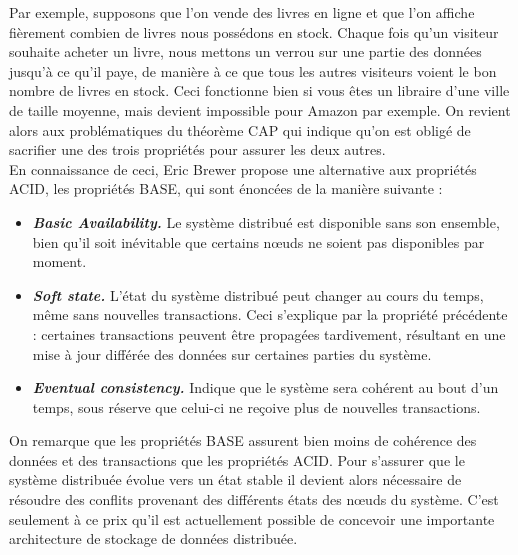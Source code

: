 	Par exemple, supposons que l'on vende des livres en ligne et que l'on affiche fièrement combien de livres nous possédons en stock. Chaque fois qu'un visiteur souhaite acheter un livre, nous mettons un verrou sur une partie des données jusqu'à ce qu'il paye, de manière à ce que tous les autres visiteurs voient le bon nombre de livres en stock. Ceci fonctionne bien si vous êtes un libraire d'une ville de taille moyenne, mais devient impossible pour Amazon par exemple. On revient alors aux problématiques du théorème CAP qui indique qu'on est obligé de sacrifier une des trois propriétés pour assurer les deux autres.\\

	En connaissance de ceci, Eric Brewer propose une alternative aux propriétés ACID, les propriétés BASE, qui sont énoncées de la manière suivante :
	\vspace{10px}
	\begin{itemize}
	 	\item \textbf{\textit{Basic Availability.}} Le système distribué est disponible sans son ensemble, bien qu'il soit inévitable que certains nœuds ne soient pas disponibles par moment.
	 	\item \textbf{\textit{Soft state.}} L'état du système distribué peut changer au cours du temps, même sans nouvelles transactions. Ceci s'explique par la propriété précédente : certaines transactions peuvent être propagées tardivement, résultant en une mise à jour différée des données sur certaines parties du système.
	 	\item \textbf{\textit{Eventual consistency.}} Indique que le système sera cohérent au bout d'un temps, sous réserve que celui-ci ne reçoive plus de nouvelles transactions.
	 \end{itemize}
	 \vspace{20px}
	 On remarque que les propriétés BASE assurent bien moins de cohérence des données et des transactions que les propriétés ACID. Pour s'assurer que le système distribuée évolue vers un état stable il devient alors nécessaire de résoudre des conflits provenant des différents états des nœuds du système. C'est seulement à ce prix qu'il est actuellement possible de concevoir une importante architecture de stockage de données distribuée. 